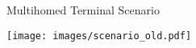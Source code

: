 %		
%		
%	

\begin{frame}{Multihomed Terminal Scenario}
	\begin{center}
		\vspace*{-1.5em}
		\texttt{[image: images/scenario\_old.pdf]}
	\end{center}
\end{frame}


